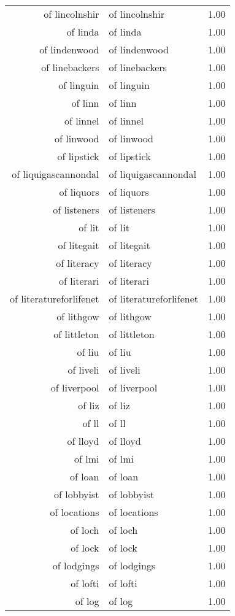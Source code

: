 \begin{table}[ht]
\begin{tabular}{rlr}
  of lincolnshir & of lincolnshir & 1.00 \\ 
  of linda & of linda & 1.00 \\ 
  of lindenwood & of lindenwood & 1.00 \\ 
  of linebackers & of linebackers & 1.00 \\ 
  of linguin & of linguin & 1.00 \\ 
  of linn & of linn & 1.00 \\ 
  of linnel & of linnel & 1.00 \\ 
  of linwood & of linwood & 1.00 \\ 
  of lipstick & of lipstick & 1.00 \\ 
  of liquigascannondal & of liquigascannondal & 1.00 \\ 
  of liquors & of liquors & 1.00 \\ 
  of listeners & of listeners & 1.00 \\ 
  of lit & of lit & 1.00 \\ 
  of litegait & of litegait & 1.00 \\ 
  of literacy & of literacy & 1.00 \\ 
  of literari & of literari & 1.00 \\ 
  of literatureforlifenet & of literatureforlifenet & 1.00 \\ 
  of lithgow & of lithgow & 1.00 \\ 
  of littleton & of littleton & 1.00 \\ 
  of liu & of liu & 1.00 \\ 
  of liveli & of liveli & 1.00 \\ 
  of liverpool & of liverpool & 1.00 \\ 
  of liz & of liz & 1.00 \\ 
  of ll & of ll & 1.00 \\ 
  of lloyd & of lloyd & 1.00 \\ 
  of lmi & of lmi & 1.00 \\ 
  of loan & of loan & 1.00 \\ 
  of lobbyist & of lobbyist & 1.00 \\ 
  of locations & of locations & 1.00 \\ 
  of loch & of loch & 1.00 \\ 
  of lock & of lock & 1.00 \\ 
  of lodgings & of lodgings & 1.00 \\ 
  of lofti & of lofti & 1.00 \\ 
  of log & of log & 1.00 \\ 

\end{tabular}
\end{table}
